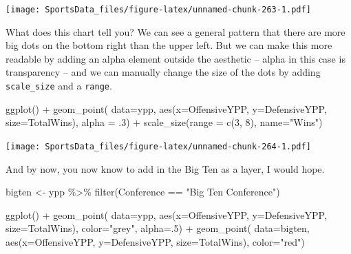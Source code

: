 \documentclass[
]{book}
\newenvironment{Shaded}{\begin{snugshade}}{\end{snugshade}}
\newcommand{\AttributeTok}[1]{\textcolor[rgb]{0.77,0.63,0.00}{#1}}
\newcommand{\DecValTok}[1]{\textcolor[rgb]{0.00,0.00,0.81}{#1}}
\newcommand{\FunctionTok}[1]{\textcolor[rgb]{0.00,0.00,0.00}{#1}}
\newcommand{\NormalTok}[1]{#1}
\newcommand{\OtherTok}[1]{\textcolor[rgb]{0.56,0.35,0.01}{#1}}
\newcommand{\SpecialCharTok}[1]{\textcolor[rgb]{0.00,0.00,0.00}{#1}}
\newcommand{\StringTok}[1]{\textcolor[rgb]{0.31,0.60,0.02}{#1}}
\begin{document}
\texttt{[image: SportsData\_files/figure-latex/unnamed-chunk-263-1.pdf]}

What does this chart tell you? We can see a general pattern that there are more big dots on the bottom right than the upper left. But we can make this more readable by adding an alpha element outside the aesthetic -- alpha in this case is transparency -- and we can manually change the size of the dots by adding \texttt{scale\_size} and a \texttt{range}.

\begin{Shaded}
\begin{Highlighting}[]
\FunctionTok{ggplot}\NormalTok{() }\SpecialCharTok{+} 
  \FunctionTok{geom\_point}\NormalTok{(}
    \AttributeTok{data=}\NormalTok{ypp, }
    \FunctionTok{aes}\NormalTok{(}\AttributeTok{x=}\NormalTok{OffensiveYPP, }\AttributeTok{y=}\NormalTok{DefensiveYPP, }\AttributeTok{size=}\NormalTok{TotalWins),}
    \AttributeTok{alpha =}\NormalTok{ .}\DecValTok{3}\NormalTok{) }\SpecialCharTok{+} 
  \FunctionTok{scale\_size}\NormalTok{(}\AttributeTok{range =} \FunctionTok{c}\NormalTok{(}\DecValTok{3}\NormalTok{, }\DecValTok{8}\NormalTok{), }\AttributeTok{name=}\StringTok{"Wins"}\NormalTok{)}
\end{Highlighting}
\end{Shaded}

\texttt{[image: SportsData\_files/figure-latex/unnamed-chunk-264-1.pdf]}

And by now, you now know to add in the Big Ten as a layer, I would hope.

\begin{Shaded}
\begin{Highlighting}[]
\NormalTok{bigten }\OtherTok{\textless{}{-}}\NormalTok{ ypp }\SpecialCharTok{\%\textgreater{}\%} \FunctionTok{filter}\NormalTok{(Conference }\SpecialCharTok{==} \StringTok{"Big Ten Conference"}\NormalTok{)}
\end{Highlighting}
\end{Shaded}

\begin{Shaded}
\begin{Highlighting}[]
\FunctionTok{ggplot}\NormalTok{() }\SpecialCharTok{+} 
  \FunctionTok{geom\_point}\NormalTok{(}
    \AttributeTok{data=}\NormalTok{ypp, }
    \FunctionTok{aes}\NormalTok{(}\AttributeTok{x=}\NormalTok{OffensiveYPP, }\AttributeTok{y=}\NormalTok{DefensiveYPP, }\AttributeTok{size=}\NormalTok{TotalWins), }
    \AttributeTok{color=}\StringTok{"grey"}\NormalTok{, }
    \AttributeTok{alpha=}\NormalTok{.}\DecValTok{5}\NormalTok{) }\SpecialCharTok{+} 
  \FunctionTok{geom\_point}\NormalTok{(}
    \AttributeTok{data=}\NormalTok{bigten, }
    \FunctionTok{aes}\NormalTok{(}\AttributeTok{x=}\NormalTok{OffensiveYPP, }\AttributeTok{y=}\NormalTok{DefensiveYPP, }\AttributeTok{size=}\NormalTok{TotalWins), }
    \AttributeTok{color=}\StringTok{"red"}\NormalTok{)}
\end{Highlighting}
\end{Shaded}
\end{document}
